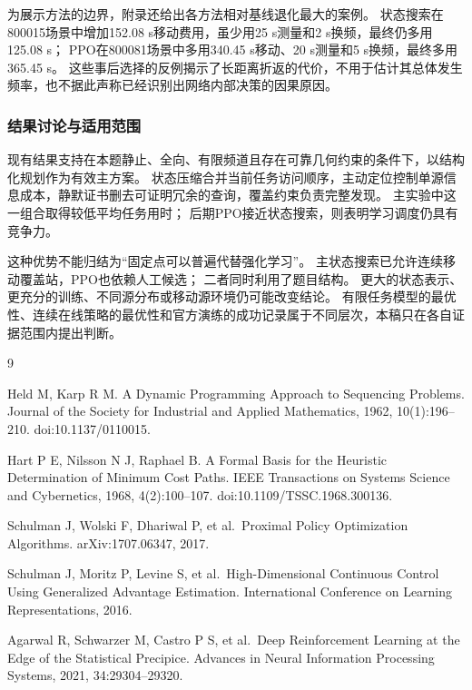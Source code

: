 \documentclass[UTF8,a4paper,zihao=5,fontset=fandol]{ctexart}
\begin{document}
为展示方法的边界，附录还给出各方法相对基线退化最大的案例。
状态搜索在800015场景中增加152.08 s移动费用，虽少用25 s测量和2 s换频，最终仍多用125.08 s；
PPO在800081场景中多用340.45 s移动、20 s测量和5 s换频，最终多用365.45 s。
这些事后选择的反例揭示了长距离折返的代价，不用于估计其总体发生频率，也不据此声称已经识别出网络内部决策的因果原因。

\subsubsection{结果讨论与适用范围}\label{sec:q3-14}

现有结果支持在本题静止、全向、有限频道且存在可靠几何约束的条件下，以结构化规划作为有效主方案。
状态压缩合并当前任务访问顺序，主动定位控制单源信息成本，静默证书删去可证明冗余的查询，覆盖约束负责完整发现。
主实验中这一组合取得较低平均任务用时；
后期PPO接近状态搜索，则表明学习调度仍具有竞争力。

这种优势不能归结为``固定点可以普遍代替强化学习''。
主状态搜索已允许连续移动覆盖站，PPO也依赖人工候选；
二者同时利用了题目结构。
更大的状态表示、更充分的训练、不同源分布或移动源环境仍可能改变结论。
有限任务模型的最优性、连续在线策略的最优性和官方演练的成功记录属于不同层次，本稿只在各自证据范围内提出判断。

\FloatBarrier


\begin{thebibliography}{9}
\small\setlength{\itemsep}{8pt}

 Held M, Karp R M. A Dynamic Programming Approach to Sequencing Problems. Journal of the Society for Industrial and Applied Mathematics, 1962, 10(1):196--210. doi:10.1137/0110015.

 Hart P E, Nilsson N J, Raphael B. A Formal Basis for the Heuristic Determination of Minimum Cost Paths. IEEE Transactions on Systems Science and Cybernetics, 1968, 4(2):100--107. doi:10.1109/TSSC.1968.300136.

 Schulman J, Wolski F, Dhariwal P, et al.~Proximal Policy Optimization Algorithms. arXiv:1707.06347, 2017.

 Schulman J, Moritz P, Levine S, et al.~High-Dimensional Continuous Control Using Generalized Advantage Estimation. International Conference on Learning Representations, 2016.

 Agarwal R, Schwarzer M, Castro P S, et al.~Deep Reinforcement Learning at the Edge of the Statistical Precipice. Advances in Neural Information Processing Systems, 2021, 34:29304--29320.

\end{thebibliography}
\end{document}
